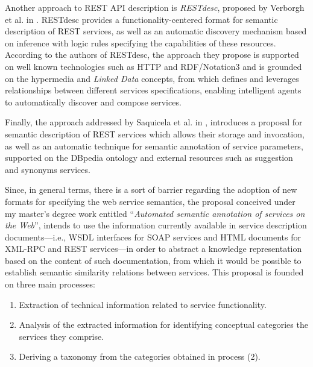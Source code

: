 Another approach to REST API description is \emph{RESTdesc}, proposed by Verborgh et al. in \cite{Verborgh:2013,Verborgh:2012a,Verborgh:2012b}. RESTdesc provides a functionality-centered format for semantic description of REST services, as well as an automatic discovery mechanism based on inference with logic rules specifying the capabilities of these resources. According to the authors of RESTdesc, the approach they propose is supported on well known technologies such as HTTP and RDF/Notation3 \cite{BernersLee:2011} and is grounded on the hypermedia and \emph{Linked Data} \cite{Bizer:2009} concepts, from which defines and leverages relationships between different services specifications, enabling intelligent agents to automatically discover and compose services.

Finally, the approach addressed by Saquicela et al. in \cite{Saquicela:2010}, introduces a proposal for semantic description of REST services which allows their storage and invocation, as well as an automatic technique for semantic annotation of service parameters, supported on the DBpedia ontology\cite{Auer:2007} and external resources such as suggestion and synonyms services.

Since, in general terms, there is a sort of barrier regarding the adoption of new formats for specifying the web service semantics, the proposal conceived under my master's degree work entitled \textquotedblleft{}\emph{Automated semantic annotation of services on the Web}\textquotedblright{}, intends to use the information currently available in service description documents---i.e., WSDL interfaces for SOAP services and HTML documents for XML-RPC and REST services---in order to abstract a knowledge representation based on the content of such documentation, from which it would be possible to establish semantic similarity relations between services. This proposal is founded on three main processes: 

\begin{enumerate}
\item Extraction of technical information related to service functionality. 
\item Analysis of the extracted information for identifying conceptual categories
the services they comprise. 
\item Deriving a taxonomy from the categories obtained in process (2). 
\end{enumerate}

